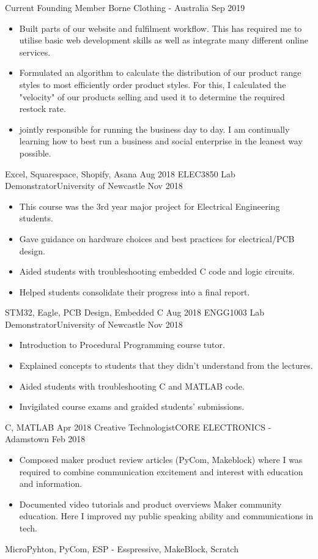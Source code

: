 \begin{experiences}
	\emptySeparator
	\experience
		{Current}	{Founding Member }{Borne Clothing - Australia}
		{Sep 2019}	{
			\begin{itemize}
				\item Built parts of our website and fulfilment workflow. This has required me to utilise basic web development skills as well as integrate many different online services.
				\item Formulated an algorithm to calculate the distribution of our product range styles to most efficiently order product styles. For this, I calculated the "velocity" of our products selling and used it to determine the required restock rate.
				\item jointly responsible for running the business day to day. I am continually learning how to best run a business and social enterprise in the leanest way possible.
			\end{itemize}
		}
		{Excel, Squarespace, Shopify, Asana}
	\emptySeparator
	\experience
	{Aug 2018}	{ELEC3850 Lab Demonstrator}{University of Newcastle}
	{Nov 2018}	{
		\begin{itemize}
			\item This course was the 3rd year major project for Electrical Engineering students.
			\item Gave guidance on hardware choices and best practices for electrical/PCB design.
			\item Aided students with troubleshooting embedded C code and logic circuits.
			\item Helped students consolidate their progress into a final report.
		\end{itemize}
	}
	{STM32, Eagle, PCB Design, Embedded C}
	\emptySeparator
	\experience
	{Aug 2018}    {ENGG1003 Lab Demonstrator}{University of Newcastle}
	{Nov 2018}    {
		\begin{itemize}
			\item Introduction to Procedural Programming course tutor.
			\item Explained concepts to students that they didn't understand from the lectures.
			\item Aided students with troubleshooting C and MATLAB code.
			\item Invigilated course exams and graided students' submissions.
		\end{itemize}
	}
	{C, MATLAB}
	\emptySeparator
	\experience
		{Apr 2018}    {Creative Technologist}{CORE ELECTRONICS - Adamstown}
		{Feb 2018}    {
			\begin{itemize}
				\item Composed maker product review articles (PyCom, Makeblock) where I was required to combine communication excitement and interest with education and information.
				\item Documented video tutorials and product overviews Maker community education. Here I improved my public speaking ability and communications in tech.
			\end{itemize}
		}
		{MicroPyhton, PyCom, ESP - Esspressive, MakeBlock, Scratch}
	\end{experiences}
